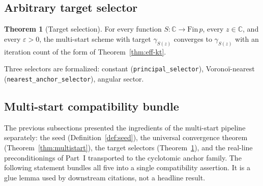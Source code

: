 \documentclass[11pt,a4paper]{article}
\theoremstyle{definition}
\newtheorem{theorem}{Theorem}[section]
\begin{document}
\subsection{Arbitrary target selector}

\begin{theorem}[Target selection]\label{thm:galois-equiv}
For every function $S : \mathbb{C} \to \mathrm{Fin}\,p$, every $z \in \mathbb{C}$, and every $\varepsilon > 0$, the multi-start scheme with target $\gamma_{S(z)}$ converges to $\gamma_{S(z)}$ with an iteration count of the form of Theorem~\ref{thm:eff-kt}.
\end{theorem}

Three selectors are formalized: constant (\texttt{principal\_selector}), Voronoï-nearest (\texttt{nearest\_anchor\_selector}), angular sector.

\subsection{Multi-start compatibility bundle}
\label{sec:grand-master}

The previous subsections presented the ingredients of the multi-start pipeline separately: the seed (Definition~\ref{def:seed}), the universal convergence theorem (Theorem~\ref{thm:multistart}), the target selectors (Theorem~\ref{thm:galois-equiv}), and the real-line preconditionings of Part~I transported to the cyclotomic anchor family. The following statement bundles all five into a single compatibility assertion. It is a glue lemma used by downstream citations, not a headline result.
\end{document}
